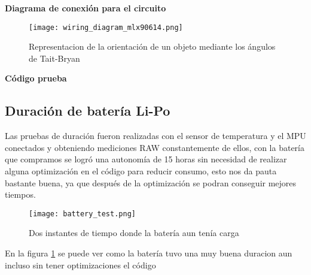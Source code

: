         \textbf{Diagrama de conexión para el circuito}
        \begin{figure}[htp!]
            \centering
                \texttt{[image: wiring\_diagram\_mlx90614.png]}
                \caption{Representacion de la orientación de un objeto mediante los ángulos de Tait-Bryan}
            \end{figure}
            \FloatBarrier 
        \textbf{Código prueba}

        \lstset{style=mystyle}

        
        
        \subsection{Duración de batería Li-Po}
        
        Las pruebas de duración fueron realizadas con el sensor de temperatura y el MPU conectados y obteniendo mediciones RAW 
        constantemente de ellos, con la batería que compramos se logró una autonomía de 15 horas sin necesidad de realizar alguna 
        optimización en el código para reducir consumo, esto nos da pauta bastante buena, ya que después de la optimización se 
        podran conseguir mejores tiempos.

        \begin{figure}[htp!]
            \centering
                 \texttt{[image: battery\_test.png]}
                  \caption{Dos instantes de tiempo donde la batería aun tenía carga }
                  \label{fig: battery_test}
        \end{figure}
        \FloatBarrier

        En la figura \ref{fig: battery_test} se puede ver como la batería tuvo una muy buena duracion aun incluso sin tener optimizaciones
        el código

